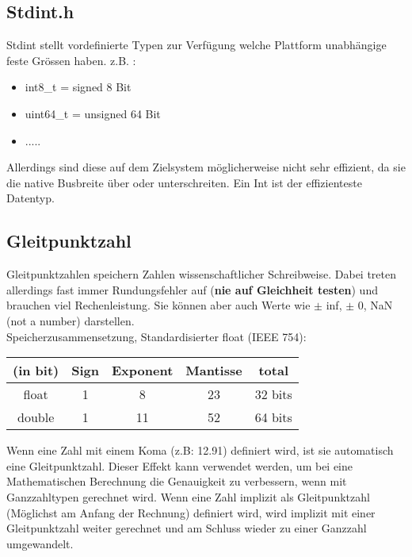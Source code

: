 \nextcol

\subsection{Stdint.h}

Stdint stellt vordefinierte Typen zur Verfügung welche Plattform unabhängige feste Grössen haben. z.B. :

\begin{itemize}[itemsep=1pt, parsep=0pt]
    \item int8\_t = signed 8 Bit
    \item uint64\_t = unsigned 64 Bit
    \item .....
\end{itemize}

Allerdings sind diese auf dem Zielsystem möglicherweise nicht sehr effizient, da sie die native Busbreite über oder unterschreiten. 
Ein Int ist der effizienteste Datentyp.

\subsection{Gleitpunktzahl}

Gleitpunktzahlen speichern Zahlen wissenschaftlicher Schreibweise. 
Dabei treten allerdings fast immer Rundungsfehler auf (\textbf{nie auf Gleichheit testen}) und brauchen viel Rechenleistung. 
Sie können aber auch Werte wie $\pm$ inf, $\pm$ 0, NaN (not a number) darstellen.\\
Speicherzusammensetzung, Standardisierter float (IEEE 754): 
\begin{center}
    \begin{tabular}{|c|c|c|c|c|} \hline  
        (in bit) & Sign  & Exponent & Mantisse & total\\ \hline  
        float & 1 & 8 & 23 & 32 bits\\ \hline  
        double & 1 & 11 & 52 & 64 bits\\ \hline   
    \end{tabular}
\end{center}

Wenn eine Zahl mit einem Koma (z.B: 12.91) definiert wird, ist sie automatisch eine Gleitpunktzahl. 
Dieser Effekt kann verwendet werden, um bei eine Mathematischen Berechnung die Genauigkeit zu verbessern, wenn mit Ganzzahltypen gerechnet wird. 
Wenn eine Zahl implizit als Gleitpunktzahl (Möglichst am Anfang der Rechnung) definiert wird, wird implizit mit einer Gleitpunktzahl weiter gerechnet und am Schluss wieder zu einer Ganzzahl umgewandelt.

